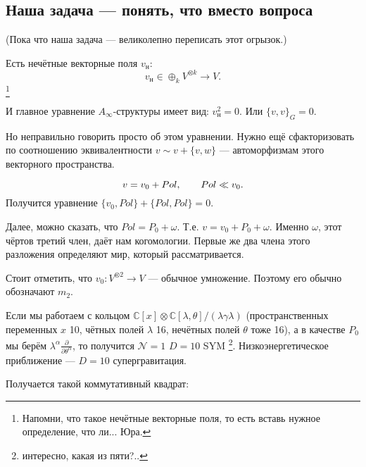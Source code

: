 \documentclass[11pt]{article}
\theoremstyle{remark}
\theoremstyle{definition}
\newcommand{\que}[1]{\footnote{\textcolor[rgb]{0.38,0.69,0.82}{#1}}}
\begin{document}
\subsection{Наша задача --- понять, что вместо вопроса}

(Пока что наша задача --- великолепно переписать этот огрызок.)

Есть нечётные векторные поля $v_{\text{н}}$: $$v_{\text{н}} \in \oplus_k V^{\otimes k} \to V.$$
\que{Напомни, что такое нечётные векторные поля, то есть вставь нужное определение, что ли... Юра.}

И главное уравнение $A_{\infty}$-структуры имеет вид: $v_{\text{н}}^2 = 0.$ Или $\{v,v\}_G = 0.$

Но неправильно говорить просто об этом уравнении. Нужно ещё сфакторизовать по соотношению эквивалентности $v\sim v + \{v,w\}$ --- автоморфизмам этого векторного пространства.

$$v = v_0 + Pol, \hskip 20 pt Pol \ll v_0.$$ Получится уравнение $\{ v_0, Pol \} + \{ Pol, Pol \} = 0.$

Далее, можно сказать, что $Pol = P_0 + \omega$. Т.е. $v = v_0 + P_0 + \omega$. Именно $\omega$, этот чёртов третий член, даёт нам когомологии. Первые же два члена этого разложения определяют мир, который рассматривается.

Стоит отметить, что $v_0: V^{\otimes 2} \to V$ --- обычное умножение. Поэтому его обычно обозначают $m_2$.

Если мы работаем с кольцом $\mathbb{C}[x] \otimes \mathbb{C}[\lambda, \theta] / (\lambda \gamma \lambda)$ (пространственных переменных $x$ 10, чётных полей $\lambda$ 16, нечётных полей $\theta$ тоже 16), а в качестве $P_0$ мы берём $\lambda^{\alpha} \frac{\partial}{\partial \theta^{\alpha}}$, то получится $\mathcal{N} = 1$ $D=10$ SYM \que{интересно, какая из пяти?..}. Низкоэнергетическое приближение --- $D=10$ супергравитация.

Получается такой коммутативный квадрат:

\end{document}
